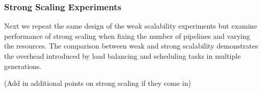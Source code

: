 







\subsubsection {Strong Scaling Experiments}

Next we repeat the same design of the weak scalability experiments but examine
performance of strong scaling when fixing the number of pipelines and varying
the resources. The comparison between weak and strong scalability demonstrates
the overhead introduced by load balancing and scheduling tasks in multiple
generations.

(Add in additional points on strong scaling if they come in)






